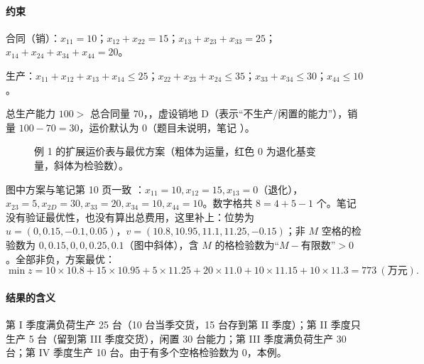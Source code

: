 \paragraph{约束 \orig}
合同（销）：$x_{11}=10$；$x_{12}+x_{22}=15$；$x_{13}+x_{23}+x_{33}=25$；$x_{14}+x_{24}+x_{34}+x_{44}=20$。\par
生产：$x_{11}+x_{12}+x_{13}+x_{14}\le25$；$x_{22}+x_{23}+x_{24}\le35$；$x_{33}+x_{34}\le30$；$x_{44}\le10$。\par
总生产能力 $100>$ 总合同量 $70$，，虚设销地 D（表示“不生产/闲置的能力”），销量 $100-70=30$，运价默认为 0（题目未说明，笔记 \orig）。

\begin{figure}[H]
\centering
{}
\caption{例 1 的扩展运价表与最优方案（粗体为运量，红色 0 为退化基变量，斜体为检验数）。}\label{fig:ex1}
\end{figure}
图中方案与笔记第 10 页一致 \orig：$x_{11}=10,x_{12}=15,x_{13}=0$（退化），$x_{23}=5,x_{2D}=30,x_{33}=20,x_{34}=10,x_{44}=10$。数字格共 $8=4+5-1$ 个。\supp 笔记没有验证最优性，也没有算出总费用，这里补上：位势为 $u=(0,0.15,-0.1,0.05)$，$v=(10.8,10.95,11.1,11.25,-0.15)$；非 $M$ 空格的检验数为 $0,0.15,0,0,0.25,0.1$（图中斜体），含 $M$ 的格检验数为“$M-$有限数”$>0$。全部非负，方案最优：
\[
\min z=10\times10.8+15\times10.95+5\times11.25+20\times11.0+10\times11.15+10\times11.3=773\ (\text{万元}).
\]
\paragraph{结果的含义}
第 I 季度满负荷生产 25 台（10 台当季交货，15 台存到第 II 季度）；第 II 季度只生产 5 台（留到第 III 季度交货），闲置 30 台能力；第 III 季度满负荷生产 30 台；第 IV 季度生产 10 台。由于有多个空格检验数为 0，本例。

